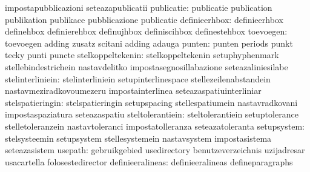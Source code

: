                                  impostapubblicazioni             seteazapublicatii
                      publicatie: publicatie                       publication
                                  publikation                      publikace
                                  pubblicazione                    publicatie
                   definieerhbox: definieerhbox                    definehbox
                                  definierehbox                    definujhbox
                                  definiscihbox                    definestehbox
                       toevoegen: toevoegen                        adding
                                  zusatz                           scitani
                                  adding                           adauga %
                          punten: punten                           periods
                                  punkt                            tecky
                                  punti                            puncte
               stelkoppeltekenin: stelkoppeltekenin                setuphyphenmark
                                  stellebindestrichein             nastavdelitko
                                  impostasegnosillabazione         seteazaliniesilabe %
                stelinterliniein: stelinterliniein                 setupinterlinespace
                                  stellezeilenabstandein           nastavmeziradkovoumezeru
                                  impostainterlinea                seteazaspatiuinterliniar
                stelspatieringin: stelspatieringin                 setupspacing
                                  stellespatiumein                 nastavradkovani
                                  impostaspaziatura                seteazaspatiu
                steltolerantiein: steltolerantiein                 setuptolerance
                                  stelletoleranzein                nastavtoleranci
                                  impostatolleranza                seteazatoleranta
                     setupsystem: stelsysteemin                    setupsystem
                                  stellesystemein                  nastavsystem
                                  impostasistema                   seteazasistem
                         usepath: gebruikgebied                    usedirectory
                                  benutzeverzeichnis               uzijadresar %
                                  usacartella                      folosestedirector %
                definieeralineas: definieeralineas                 defineparagraphs
